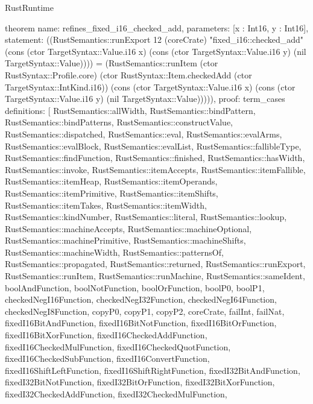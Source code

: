 \begin{lexlean}{RustRuntime}
\begin{semanticmodule}
theorem{
  name: refines_fixed_i16_checked_add,
  parameters: [x : Int16, y : Int16],
  statement: ((RustSemantics::runExport 12 (coreCrate) "fixed_i16::checked_add" (cons (ctor TargetSyntax::Value.i16 x) (cons (ctor TargetSyntax::Value.i16 y) (nil TargetSyntax::Value)))) = (RustSemantics::runItem (ctor RustSyntax::Profile.core) (ctor RustSyntax::Item.checkedAdd (ctor TargetSyntax::IntKind.i16)) (cons (ctor TargetSyntax::Value.i16 x) (cons (ctor TargetSyntax::Value.i16 y) (nil TargetSyntax::Value))))),
  proof: term_cases{
    definitions: [
      RustSemantics::allWidth,
      RustSemantics::bindPattern,
      RustSemantics::bindPatterns,
      RustSemantics::constructValue,
      RustSemantics::dispatched,
      RustSemantics::eval,
      RustSemantics::evalArms,
      RustSemantics::evalBlock,
      RustSemantics::evalList,
      RustSemantics::fallibleType,
      RustSemantics::findFunction,
      RustSemantics::finished,
      RustSemantics::hasWidth,
      RustSemantics::invoke,
      RustSemantics::itemAccepts,
      RustSemantics::itemFallible,
      RustSemantics::itemHeap,
      RustSemantics::itemOperands,
      RustSemantics::itemPrimitive,
      RustSemantics::itemShifts,
      RustSemantics::itemTakes,
      RustSemantics::itemWidth,
      RustSemantics::kindNumber,
      RustSemantics::literal,
      RustSemantics::lookup,
      RustSemantics::machineAccepts,
      RustSemantics::machineOptional,
      RustSemantics::machinePrimitive,
      RustSemantics::machineShifts,
      RustSemantics::machineWidth,
      RustSemantics::patternsOf,
      RustSemantics::propagated,
      RustSemantics::returned,
      RustSemantics::runExport,
      RustSemantics::runItem,
      RustSemantics::runMachine,
      RustSemantics::sameIdent,
      boolAndFunction,
      boolNotFunction,
      boolOrFunction,
      boolP0,
      boolP1,
      checkedNegI16Function,
      checkedNegI32Function,
      checkedNegI64Function,
      checkedNegI8Function,
      copyP0,
      copyP1,
      copyP2,
      coreCrate,
      failInt,
      failNat,
      fixedI16BitAndFunction,
      fixedI16BitNotFunction,
      fixedI16BitOrFunction,
      fixedI16BitXorFunction,
      fixedI16CheckedAddFunction,
      fixedI16CheckedMulFunction,
      fixedI16CheckedQuotFunction,
      fixedI16CheckedSubFunction,
      fixedI16ConvertFunction,
      fixedI16ShiftLeftFunction,
      fixedI16ShiftRightFunction,
      fixedI32BitAndFunction,
      fixedI32BitNotFunction,
      fixedI32BitOrFunction,
      fixedI32BitXorFunction,
      fixedI32CheckedAddFunction,
      fixedI32CheckedMulFunction,
}}
\end{semanticmodule}
\end{lexlean}
